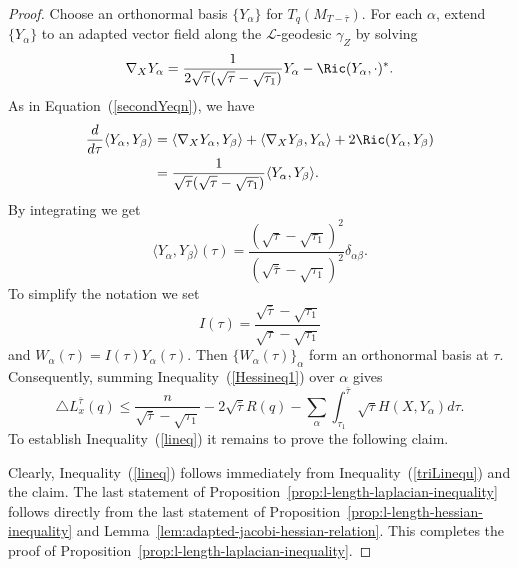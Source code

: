 \begin{proof}
\sketch
{}
Choose an orthonormal basis $\{Y_{\alpha}\}$ for
$T_q(M_{T-\bar\tau})$. For each $\alpha$, extend $\{Y_{\alpha}\}$ to
an adapted vector field along the $ \mathcal{L}$-geodesic $\gamma_Z$
by solving
$$\nabla_{X}Y_{\alpha} = \frac{1}{2\sqrt{\tau}(\sqrt{\tau}-\sqrt{\tau_1})}Y_{\alpha}
-\Ric(Y_{\alpha},\cdot)^*.$$ As in Equation~(\ref{secondYeqn}),
we have
\begin{align*}
\frac{d}{d\tau}\langle Y_{\alpha},Y_{\beta}\rangle  &= \langle
\nabla_{X}Y_{\alpha},Y_{\beta}\rangle  + \langle
\nabla_{X}Y_{\beta}, Y_{\alpha}\rangle + 2\Ric(Y_{\alpha},Y_{\beta})
\\&= \frac{1}{\sqrt{\tau}(\sqrt{\tau}-\sqrt{\tau_1})}\langle Y_{\alpha},Y_{\beta}\rangle .
\end{align*}
 By integrating we get $$\langle Y_{\alpha},Y_{\beta}\rangle (\tau) =
\frac{(\sqrt{\tau}-\sqrt{\tau_1})^2}{(\sqrt{\bar\tau}-\sqrt{\tau_1})^2}\delta_{\alpha\beta}.$$
To simplify the notation we set
$$I(\tau)=\frac{\sqrt{\bar\tau}-\sqrt{\tau_1}}{\sqrt{\tau}-\sqrt{\tau_1}}$$
and $W_\alpha(\tau)=I(\tau)Y_\alpha(\tau)$.
 Then $\{W_{\alpha}(\tau)\}_\alpha$
form an orthonormal basis at $\tau$. Consequently, summing
Inequality~(\ref{Hessineq1}) over $\alpha$ gives
\begin{equation}\label{triLinequ}
\triangle L_x^{\bar\tau}(q)\le
\frac{n}{\sqrt{\bar\tau}-\sqrt{\tau_1}}
-2\sqrt{\bar\tau}R(q)-\sum_\alpha\int_{\tau_1}^{\bar\tau}\sqrt{\tau}H(X,Y_\alpha)d\tau.\end{equation}
To establish Inequality~(\ref{lineq}) it remains to prove the
following claim.


Clearly, Inequality~(\ref{lineq}) follows immediately from
Inequality~(\ref{triLinequ}) and the claim. The last statement of
Proposition~\ref{prop:l-length-laplacian-inequality} follows directly from the last statement of
Proposition~\ref{prop:l-length-hessian-inequality} and Lemma~\ref{lem:adapted-jacobi-hessian-relation}. This completes
the proof of Proposition~\ref{prop:l-length-laplacian-inequality}.
\end{proof}


